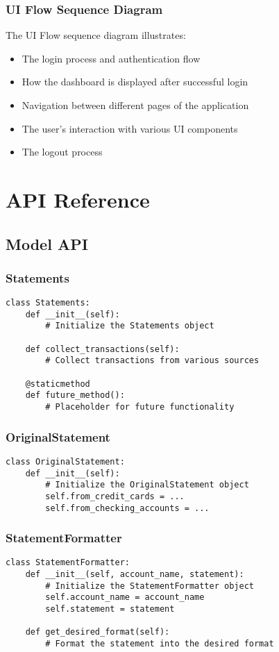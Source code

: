 \documentclass[11pt,a4paper]{report}
\begin{document}
\subsection{UI Flow Sequence Diagram}
The UI Flow sequence diagram illustrates:
\begin{itemize}
    \item The login process and authentication flow
    \item How the dashboard is displayed after successful login
    \item Navigation between different pages of the application
    \item The user's interaction with various UI components
    \item The logout process
\end{itemize}

\chapter{API Reference}

\section{Model API}

\subsection{Statements}
\begin{lstlisting}
class Statements:
    def __init__(self):
        # Initialize the Statements object
        
    def collect_transactions(self):
        # Collect transactions from various sources
        
    @staticmethod
    def future_method():
        # Placeholder for future functionality
\end{lstlisting}

\subsection{OriginalStatement}
\begin{lstlisting}
class OriginalStatement:
    def __init__(self):
        # Initialize the OriginalStatement object
        self.from_credit_cards = ...
        self.from_checking_accounts = ...
\end{lstlisting}

\subsection{StatementFormatter}
\begin{lstlisting}
class StatementFormatter:
    def __init__(self, account_name, statement):
        # Initialize the StatementFormatter object
        self.account_name = account_name
        self.statement = statement
        
    def get_desired_format(self):
        # Format the statement into the desired format
\end{lstlisting}
\end{document}
